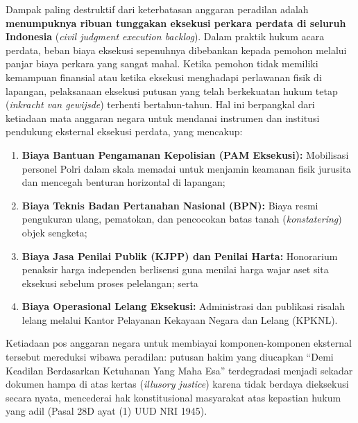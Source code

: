 \documentclass[12pt,a4paper,twocolumn]{article}
\begin{document}
Dampak paling destruktif dari keterbatasan anggaran peradilan adalah \textbf{menumpuknya ribuan tunggakan eksekusi perkara perdata di seluruh Indonesia} (\textit{civil judgment execution backlog}). Dalam praktik hukum acara perdata, beban biaya eksekusi sepenuhnya dibebankan kepada pemohon melalui panjar biaya perkara yang sangat mahal. Ketika pemohon tidak memiliki kemampuan finansial atau ketika eksekusi menghadapi perlawanan fisik di lapangan, pelaksanaan eksekusi putusan yang telah berkekuatan hukum tetap (\textit{inkracht van gewijsde}) terhenti bertahun-tahun. Hal ini berpangkal dari ketiadaan mata anggaran negara untuk mendanai instrumen dan institusi pendukung eksternal eksekusi perdata, yang mencakup:
\begin{enumerate}
    \item \textbf{Biaya Bantuan Pengamanan Kepolisian (PAM Eksekusi):} Mobilisasi personel Polri dalam skala memadai untuk menjamin keamanan fisik jurusita dan mencegah benturan horizontal di lapangan;
    \item \textbf{Biaya Teknis Badan Pertanahan Nasional (BPN):} Biaya resmi pengukuran ulang, pematokan, dan pencocokan batas tanah (\textit{konstatering}) objek sengketa;
    \item \textbf{Biaya Jasa Penilai Publik (KJPP) dan Penilai Harta:} Honorarium penaksir harga independen berlisensi guna menilai harga wajar aset sita eksekusi sebelum proses pelelangan; serta
    \item \textbf{Biaya Operasional Lelang Eksekusi:} Administrasi dan publikasi risalah lelang melalui Kantor Pelayanan Kekayaan Negara dan Lelang (KPKNL).
\end{enumerate}
Ketiadaan pos anggaran negara untuk membiayai komponen-komponen eksternal tersebut mereduksi wibawa peradilan: putusan hakim yang diucapkan ``Demi Keadilan Berdasarkan Ketuhanan Yang Maha Esa'' terdegradasi menjadi sekadar dokumen hampa di atas kertas (\textit{illusory justice}) karena tidak berdaya dieksekusi secara nyata, mencederai hak konstitusional masyarakat atas kepastian hukum yang adil (Pasal 28D ayat (1) UUD NRI 1945).
\end{document}
